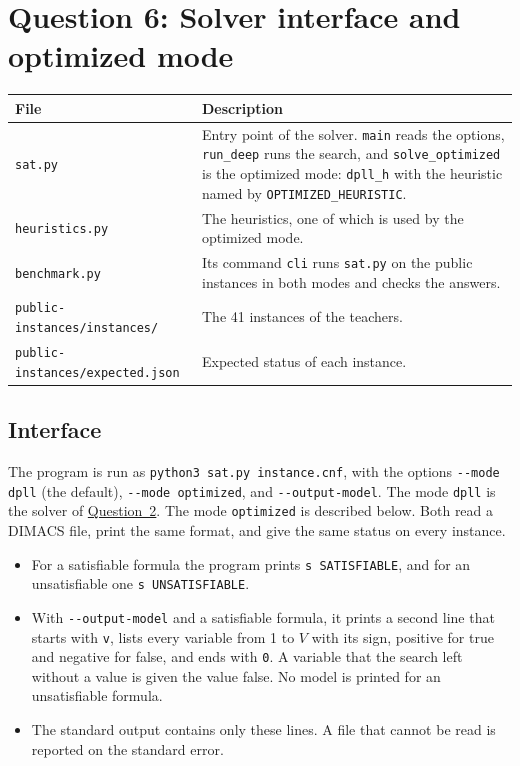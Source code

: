 \section{Question 6: Solver interface and optimized mode}\label{sec:q6}

\begin{center}
\begin{tabular}{@{}p{6.2cm}p{10cm}@{}}
\toprule
File & Description\\
\midrule
\texttt{sat.py} & Entry point of the solver. \texttt{main} reads the options, \texttt{run\_deep} runs the search, and \texttt{solve\_optimized} is the optimized mode: \texttt{dpll\_h} with the heuristic named by \texttt{OPTIMIZED\_HEURISTIC}.\\
\texttt{heuristics.py} & The heuristics, one of which is used by the optimized mode.\\
\texttt{benchmark.py} & Its command \texttt{cli} runs \texttt{sat.py} on the public instances in both modes and checks the answers.\\
\texttt{public-instances/instances/} & The 41 instances of the teachers.\\
\texttt{public-instances/expected.json} & Expected status of each instance.\\
\bottomrule
\end{tabular}
\end{center}

\subsection{Interface}

The program is run as \texttt{python3 sat.py instance.cnf}, with the options \texttt{-{}-mode dpll} (the default), \texttt{-{}-mode optimized}, and \texttt{-{}-output-model}. The mode \texttt{dpll} is the solver of \hyperref[sec:q2]{Question~2}. The mode \texttt{optimized} is described below. Both read a DIMACS file, print the same format, and give the same status on every instance.
\begin{itemize}
\item For a satisfiable formula the program prints \texttt{s SATISFIABLE}, and for an unsatisfiable one \texttt{s UNSATISFIABLE}.
\item With \texttt{-{}-output-model} and a satisfiable formula, it prints a second line that starts with \texttt{v}, lists every variable from 1 to $V$ with its sign, positive for true and negative for false, and ends with \texttt{0}. A variable that the search left without a value is given the value false. No model is printed for an unsatisfiable formula.
\item The standard output contains only these lines. A file that cannot be read is reported on the standard error.
\end{itemize}

